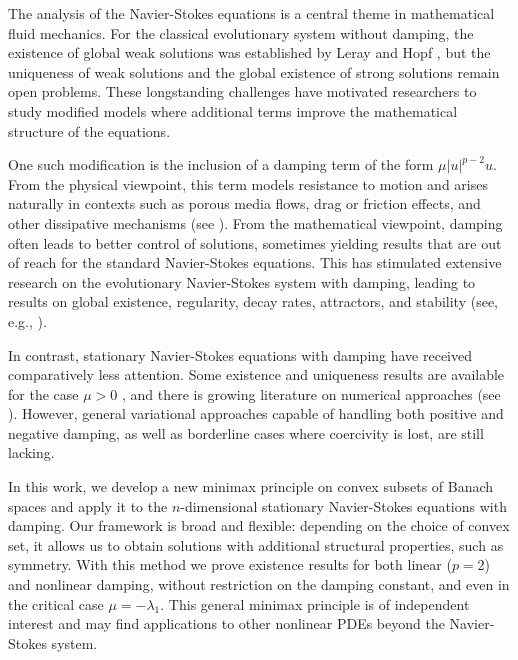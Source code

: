 \documentclass[10pt,a4paper]{amsart}
\numberwithin{equation}{section}
\begin{document}
The analysis of the Navier-Stokes equations is a central theme in mathematical fluid
mechanics. For the classical evolutionary system without damping, the existence of
global weak solutions was established by Leray \cite{JL} and Hopf \cite{EH}, but the
uniqueness of weak solutions and the global existence of strong solutions remain open
problems. These longstanding challenges have motivated researchers to study modified
models where additional terms improve the mathematical structure of the equations.

One such modification is the inclusion of a damping term of the form $\mu |u|^{p-2}u$.
From the physical viewpoint, this term models resistance to motion and arises naturally
in contexts such as porous media flows, drag or friction effects, and other dissipative
mechanisms (see \cite{LHS, RTE}). From the mathematical viewpoint, damping often
leads to better control of solutions, sometimes yielding results that are out of reach
for the standard Navier-Stokes equations. This has stimulated extensive research on the
evolutionary Navier-Stokes system with damping, leading to results on global existence,
regularity, decay rates, attractors, and stability (see, e.g.,
\cite{XC, YJX, ZHJ, ZHM, XLS,ZJZ, YZ, ZZC}).

In contrast,  stationary Navier-Stokes equations with damping have received comparatively
less attention. Some existence and uniqueness results are available for the case
$\mu > 0$ \cite{WLW}, and there is growing literature on numerical approaches
(see \cite{ZLD, LML, HQL, HQY, ZBS}). However, general variational approaches capable
of handling both positive and negative damping, as well as borderline cases where
coercivity is lost, are still lacking.

In this work, we develop a new minimax principle on convex subsets of Banach spaces and
apply it to the $n$-dimensional stationary Navier-Stokes equations with damping.
Our framework is broad and flexible: depending on the choice of convex set, it allows
us to obtain solutions with additional structural properties, such as symmetry.
With this method we prove existence results for both linear ($p=2$) and nonlinear
damping, without restriction on the damping constant, and even in the critical case
$\mu = -\lambda_1$. This general minimax principle is of independent interest and may
find applications to other nonlinear PDEs beyond the Navier-Stokes system.
\end{document}
